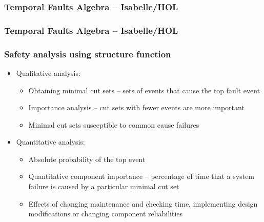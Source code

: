\begin{frame}
\frametitle{Temporal Faults Algebra -- Isabelle/HOL}

\end{frame}

\begin{frame}
\frametitle{Temporal Faults Algebra -- Isabelle/HOL}
\end{frame}

\begin{frame}
\frametitle{Safety analysis using structure function}

\begin{itemize}
  \item Qualitative analysis:
    \begin{itemize}
      \item Obtaining minimal cut sets -- sets of events that cause the top fault event 
      \item Importance analysis -- cut sets with fewer events are more important
      \item Minimal cut sets susceptible to common cause failures
    \end{itemize}
  \item Quantitative analysis:
    \begin{itemize}
      \item Absolute probability of the top event 
      \item Quantitative component importance -- percentage of time that a system failure is caused by a particular minimal cut set
      \item Effects of changing maintenance and checking time, implementing design modifications or changing component reliabilities
    \end{itemize}
\end{itemize}
\end{frame}

